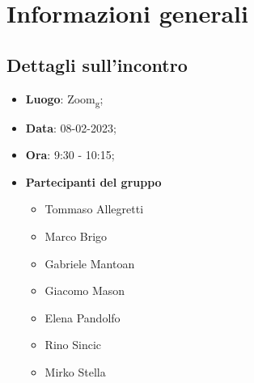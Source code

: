 \section{Informazioni generali}

\subsection{Dettagli sull'incontro}
\begin{itemize}
    \item \textbf{Luogo}: Zoom\textsubscript{g};
    \item \textbf{Data}: 08-02-2023;
    \item \textbf{Ora}: 9:30 - 10:15;
    \item \textbf{Partecipanti del gruppo}
        \begin{itemize}
            \item Tommaso Allegretti
            \item Marco Brigo
            \item Gabriele Mantoan
            \item Giacomo Mason
            \item Elena Pandolfo
            \item Rino Sincic
            \item Mirko Stella
        \end{itemize}
\end{itemize}

